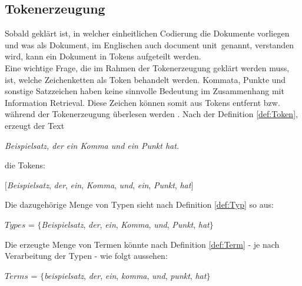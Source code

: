 \subsection{Tokenerzeugung}\label{sub:tokenerzeugung}
Sobald geklärt ist, in welcher einheitlichen Codierung die Dokumente vorliegen und was als Dokument, im Englischen auch \glqq document unit\grqq\ genannt, verstanden wird, kann ein Dokument in Tokens aufgeteilt werden.
\\
Eine wichtige Frage, die im Rahmen der Tokenerzeugung geklärt werden muss, ist, welche Zeichenketten als Token behandelt werden. Kommata, Punkte und sonstige Satzzeichen haben keine sinnvolle Bedeutung im Zusammenhang mit Information Retrieval. Diese Zeichen können somit aus Tokens entfernt bzw. während der Tokenerzeugung überlesen werden \cite{IR_Intro_Cambridge}. Nach der Definition \ref{def:Token}, erzeugt der Text
\begin{center}
	\textit{Beispielsatz, der ein Komma und ein Punkt hat.}
\end{center}
die Tokens:
\begin{center}
$[$\textit{Beispielsatz}, \textit{der}, \textit{ein}, \textit{Komma}, \textit{und}, \textit{ein}, \textit{Punkt}, \textit{hat}$]$
\end{center}
Die dazugehörige Menge von Typen sieht nach Definition \ref{def:Typ} so aus:
\begin{center}
	$Types$ = $\{$\textit{Beispielsatz}, \textit{der}, \textit{ein}, \textit{Komma}, \textit{und}, \textit{Punkt}, \textit{hat}$\}$
\end{center}
Die erzeugte Menge von Termen könnte nach Definition \ref{def:Term} - je nach Verarbeitung der Typen - wie folgt aussehen:
\begin{center}
	$Terms$ = $\{$\textit{beispielsatz}, \textit{der}, \textit{ein}, \textit{komma}, \textit{und}, \textit{punkt}, \textit{hat}$\}$
\end{center}

